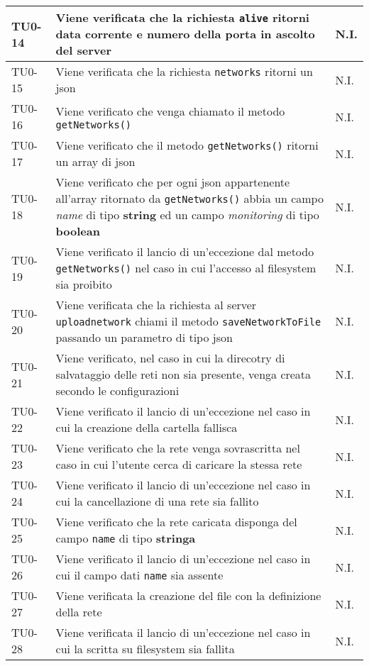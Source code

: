 \begin{longtable}{|C{.15\textwidth}|m{.66\textwidth}|C{.10\textwidth}|}
\hline
 TU0-14 & Viene verificata che la richiesta \texttt{alive} ritorni data corrente e numero della porta in ascolto del server & N.I. \\ 
\hline 
{}TU0-15 & Viene verificata che la richiesta \texttt{networks} ritorni un json & N.I. \\ 
\hline 
 TU0-16 & Viene verificato che venga chiamato il metodo \texttt{getNetworks()} & N.I. \\
\hline 
{}TU0-17 & Viene verificato che il metodo \texttt{getNetworks()} ritorni un array di json & N.I. \\ 
\hline
TU0-18 & Viene verificato che per ogni json appartenente all'array ritornato da \texttt{getNetworks()} abbia un campo \textit{name} di tipo \textbf{string} ed un campo \textit{monitoring} di tipo \textbf{boolean} & N.I. \\ 
\hline
{}TU0-19 & Viene verificato il lancio di un'eccezione dal metodo \texttt{getNetworks()} nel caso in cui l'accesso al filesystem sia proibito & N.I. \\ 
\hline 
TU0-20 & Viene verificata che la richiesta al server \texttt{uploadnetwork} chiami il metodo \texttt{saveNetworkToFile} passando un parametro di tipo json & N.I. \\ 
\hline 
{}TU0-21 & Viene verificato, nel caso in cui la direcotry di salvataggio delle reti non sia presente, venga creata secondo le configurazioni & N.I. \\ 
\hline 
 TU0-22 & Viene verificato il lancio di un'eccezione nel caso in cui la creazione della cartella fallisca & N.I. \\ 
\hline 
{}TU0-23 & Viene verificato che la rete venga sovrascritta nel caso in cui l'utente cerca di caricare la stessa rete & N.I. \\
\hline
 TU0-24 & Viene verificato il lancio di un'eccezione nel caso in cui la cancellazione di una rete sia fallito & N.I. \\ 
\hline
{}TU0-25 & Viene verificato che la rete caricata disponga del campo \texttt{name} di tipo \textbf{stringa} & N.I. \\ 
\hline 
 TU0-26 & Viene verificato il lancio di un'eccezione nel caso in cui il campo dati \texttt{name} sia assente & N.I. \\ 
\hline 
{}TU0-27	 & Viene verificata la creazione del file con la definizione della rete & N.I. \\ 
\hline 
 TU0-28 & Viene verificata il lancio di un'eccezione nel caso in cui la scritta su filesystem sia fallita & N.I. \\ 

\end{longtable}

